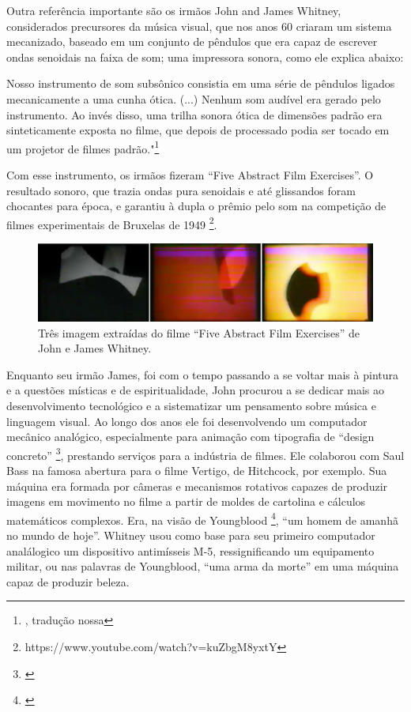 Outra referência importante são os irmãos John and James Whitney, considerados precursores da música visual, que nos anos 60 criaram um sistema mecanizado, baseado em um conjunto de pêndulos que era capaz de escrever ondas senoidais na faixa de som; uma impressora sonora, como ele explica abaixo:

\begin{citacao}
Nosso instrumento de som subsônico consistia em uma série de pêndulos ligados mecanicamente a uma cunha ótica. (...) Nenhum som audível era gerado pelo instrumento. Ao invés disso, uma trilha sonora ótica de dimensões padrão era sinteticamente exposta no filme, que depois de processado podia ser tocado em um projetor de filmes padrão."\footnote{\cite[152]{Whitney1980}, tradução nossa} 
\end{citacao}

Com esse instrumento, os irmãos fizeram ``Five Abstract Film Exercises''. O resultado sonoro, que trazia ondas pura senoidais e até glissandos foram chocantes para época, e garantiu à dupla o prêmio pelo som na competição de filmes experimentais de Bruxelas de 1949 \footnote{https://www.youtube.com/watch?v=kuZbgM8yxtY}.

\begin{figure}
    \caption{\label{witney}Três imagem extraídas do filme ``Five Abstract Film Exercises'' de John e James Whitney.}
    
        \includegraphics[width=1\linewidth]{pictures/cap2/witney}
    
\end{figure}

Enquanto seu irmão James, foi com o tempo passando a se voltar mais à pintura e a questões místicas e de espiritualidade, John procurou a se dedicar mais ao desenvolvimento tecnológico e a sistematizar um pensamento sobre música e linguagem visual. Ao longo dos anos ele foi desenvolvendo um computador mecânico analógico, especialmente para animação com tipografia de ``design concreto'' \footnote{\cite{Youngblood1970}}, prestando serviços para a indústria de filmes. Ele colaborou com Saul Bass na famosa abertura para o filme Vertigo, de Hitchcock, por exemplo. Sua máquina era formada por câmeras e mecanismos rotativos capazes de produzir imagens em movimento no filme a partir de moldes de cartolina e cálculos matemáticos complexos. Era, na visão de Youngblood \footnote{\cite{Youngblood1970}}, ``um homem de amanhã no mundo de hoje''. Whitney usou como base para seu primeiro computador analálogico um dispositivo antimísseis M-5, ressignificando um equipamento militar, ou nas palavras de Youngblood, ``uma arma da morte'' em uma máquina capaz de produzir beleza.

